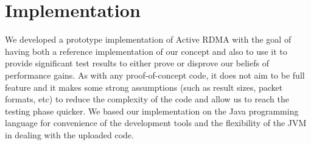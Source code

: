 \documentclass[10pt]{article}
\begin{document}
\section{Implementation}


We developed a prototype implementation of Active RDMA with the goal of having both a reference implementation of our concept and also to use it to provide significant test results to either prove or disprove our beliefs of performance gains. As with any proof-of-concept code, it does not aim to be full feature and it makes some strong assumptions (such as result sizes, packet formats, etc) to reduce the complexity of the code and allow us to reach the testing phase quicker. We based our implementation on the Java programming language for convenience of the development tools and the flexibility of the JVM in dealing with the uploaded code.
\end{document}
